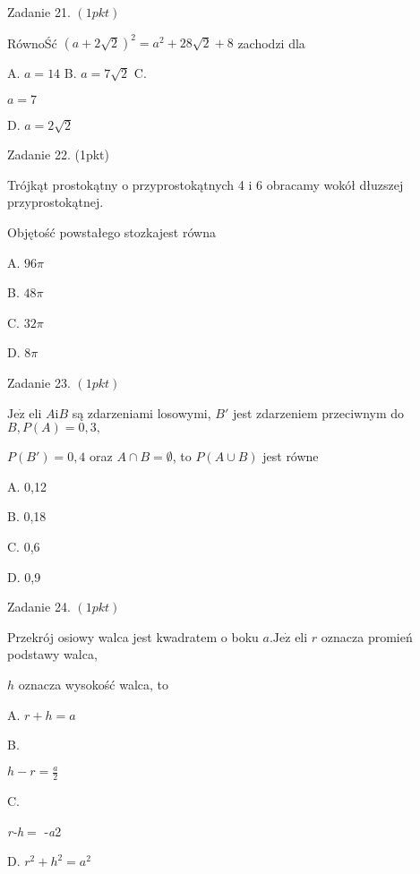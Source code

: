 \documentclass[a4paper,12pt]{article}
\begin{document}
Zadanie 21. $(1pkt)$

RównoŚć $(a+2\sqrt{2})^{2}=a^{2}+28\sqrt{2}+8$ zachodzi dla

A. $a=14$ B. $a=7\sqrt{2}$ C.

$a=7$

D. $a=2\sqrt{2}$

Zadanie 22. (1pkt)

Trójkąt prostokątny o przyprostokątnych 4 i 6 obracamy wokół dłuzszej przyprostokątnej.

Objętość powstałego stozkajest równa

A. $ 96\pi$

B. $ 48\pi$

C. $ 32\pi$

D. $ 8\pi$

Zadanie 23. $(1pkt)$

$\mathrm{J}\mathrm{e}\dot{\mathrm{z}}$ eli $A \mathrm{i} B$ są zdarzeniami losowymi, $B'$ jest zdarzeniem przeciwnym do $B, P(A)=0,3,$

$P(B')=0,4$ oraz $ A\cap B=\emptyset$, to $P(A\cup B)$ jest równe

A. 0,12

B. 0,18

C. 0,6

D. 0,9

Zadanie 24. $(1pkt)$

Przekrój osiowy walca jest kwadratem o boku $a. \mathrm{J}\mathrm{e}\dot{\mathrm{z}}$ eli $r$ oznacza promień podstawy walca,

$h$ oznacza wysokość walca, to

A. $r+h=a$

B.

$h-r=\displaystyle \frac{a}{2}$

C.

{\it r-h}$=$ -{\it a}2

D. $r^{2}+h^{2}=a^{2}$
\end{document}
